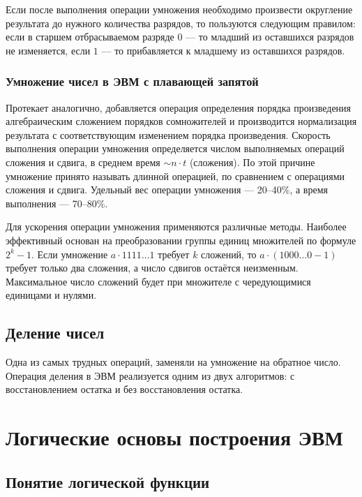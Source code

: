 \documentclass[10pt,a4paper,titlepage]{article}
\begin{document}
Если после выполнения операции умножения необходимо произвести округление результата до нужного количества разрядов, то пользуются следующим правилом: если в старшем отбрасываемом разряде 0 --- то младший из оставшихся разрядов не изменяется, если $1$ --- то прибавляется к младшему из оставшихся разрядов.

\subsubsection{Умножение чисел в ЭВМ с плавающей запятой}

Протекает аналогично, добавляется операция определения порядка произведения алгебраическим сложением порядков сомножителей и производится нормализация результата с соответствующим изменением порядка произведения.
Скорость выполнения операции умножения определяется числом выполняемых операций сложения и сдвига, в среднем время $\sim n\cdot t$ (сложения).
По этой причине умножение принято называть длинной операцией, по сравнением с операциями сложения и сдвига.
Удельный вес операции умножения --- 20--40\%, а время выполнения --- 70--80\%.

Для ускорения операции умножения применяются различные методы.
Наиболее эффективный основан на преобразовании группы единиц множителей по формуле $2^k-1$. Если умножение $a \cdot 1111\dots{}1$ требует $k$ сложений, то $a \cdot (1000 \dots 0-1)$ требует только два сложения, а число сдвигов остаётся неизменным.
Максимальное число сложений будет при множителе с чередующимися единицами и нулями.

\subsection{Деление чисел}

Одна из самых трудных операций, заменяли на умножение на обратное число.
Операция деления в ЭВМ реализуется одним из двух алгоритмов: с восстановлением остатка и без восстановления остатка.

\newpage
\section{Логические основы построения ЭВМ}

\subsection{Понятие логической функции}
\end{document}
